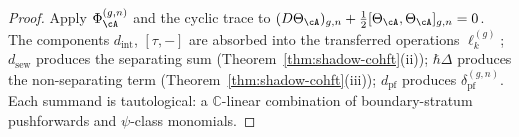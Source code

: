 \begin{proof}
Apply $\Phi_\cA^{(g,n)}$ and the cyclic trace to
$(D\Theta_\cA)_{g,n}
+ \tfrac{1}{2}[\Theta_\cA, \Theta_\cA]_{g,n}
= 0$.
The components $d_{\mathrm{int}}$, $[\tau,-]$ are absorbed into the
transferred operations $\ell_k^{(g)}$;
$d_{\mathrm{sew}}$ produces the separating sum
(Theorem~\ref{thm:shadow-cohft}(ii));
$\hbar\Delta$ produces the non-separating term
(Theorem~\ref{thm:shadow-cohft}(iii));
$d_{\mathrm{pf}}$ produces
$\delta_{\mathrm{pf}}^{(g,n)}$.
Each summand is tautological: a $\mathbb{C}$-linear combination of
boundary-stratum pushforwards and $\psi$-class monomials.
\end{proof}

